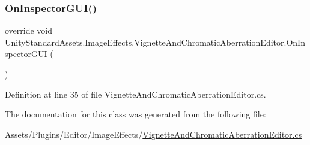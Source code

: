 \subsubsection{\texorpdfstring{On\+Inspector\+G\+U\+I()}{OnInspectorGUI()}}
{\footnotesize\ttfamily override void Unity\+Standard\+Assets.\+Image\+Effects.\+Vignette\+And\+Chromatic\+Aberration\+Editor.\+On\+Inspector\+G\+UI (\begin{DoxyParamCaption}{ }\end{DoxyParamCaption})}



Definition at line 35 of file Vignette\+And\+Chromatic\+Aberration\+Editor.\+cs.



The documentation for this class was generated from the following file\+:\begin{DoxyCompactItemize}
\item 
Assets/\+Plugins/\+Editor/\+Image\+Effects/\mbox{\hyperlink{_vignette_and_chromatic_aberration_editor_8cs}{Vignette\+And\+Chromatic\+Aberration\+Editor.\+cs}}\end{DoxyCompactItemize}
